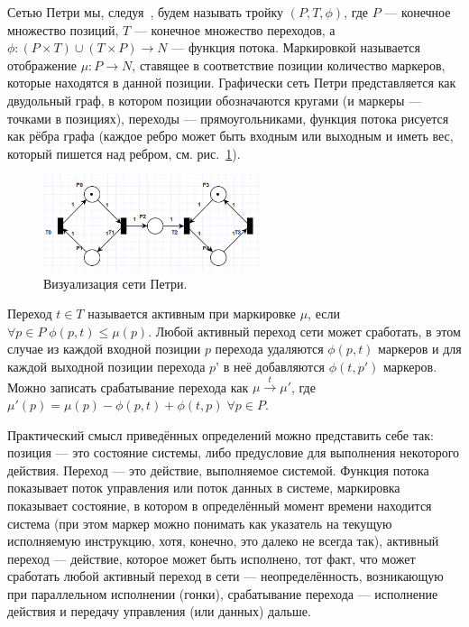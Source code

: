 \documentclass[a4, 14pt]{article}
\begin{document}
Сетью Петри мы, следуя~\cite{yen2006petri}, будем называть тройку $(P,T,\phi)$, 
где $P$ --- конечное множество позиций, $T$ --- конечное множество переходов, 
а $\phi:(P\times{T})\cup(T\times{P})\rightarrow{N}$ --- функция потока. Маркировкой 
называется отображение $\mu:P\rightarrow{N}$, ставящее в соответствие позиции 
количество маркеров, которые находятся в данной позиции. Графически сеть Петри 
представляется как двудольный граф, в котором позиции обозначаются кругами 
(и маркеры --- точками в позициях), переходы --- прямоугольниками, функция 
потока рисуется как рёбра графа (каждое ребро может быть входным или выходным 
и иметь вес, который пишется над ребром, см. рис.~\ref{image:petri}).

\begin{figure}[ht]
	\centering
	\includegraphics[width=2.5in]{petri.png}
	\caption{Визуализация сети Петри.}
	\label{image:petri}
\end{figure}

Переход $t\in{T}$ называется активным при маркировке $\mu$, если 
$\forall{p}\in{P}\;\phi(p,t)\le\mu(p)$. Любой активный переход сети может 
сработать, в этом случае из каждой входной позиции $p$ перехода удаляются 
$\phi(p,t)$ маркеров и для каждой выходной позиции перехода $p’$ в неё добавляются 
$\phi(t,p')$ маркеров. Можно записать срабатывание перехода как 
$\mu\stackrel{t}{\rightarrow}\mu'$, где $\mu'(p)=\mu(p)-\phi(p,t)+\phi(t,p)\;\forall{p}\in{P}$.

Практический смысл приведённых определений можно представить себе так: позиция --- 
это состояние системы, либо предусловие для выполнения некоторого действия. 
Переход --- это действие, выполняемое системой. Функция потока показывает поток 
управления или поток данных в системе, маркировка показывает состояние, в котором 
в определённый момент времени находится система (при этом маркер можно понимать 
как указатель на текущую исполняемую инструкцию, хотя, конечно, это далеко не 
всегда так), активный переход --- действие, которое может быть исполнено, тот 
факт, что может сработать любой активный переход в сети --- неопределённость, 
возникающую при параллельном исполнении (гонки), срабатывание перехода --- 
исполнение действия и передачу управления (или данных) дальше.
\end{document}
